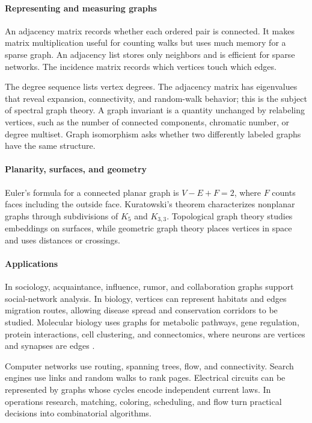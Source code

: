 \paragraph{Representing and measuring graphs}
An adjacency matrix records whether each ordered pair is connected. It makes matrix multiplication useful for counting walks but uses much memory for a sparse graph. An adjacency list stores only neighbors and is efficient for sparse networks. The incidence matrix records which vertices touch which edges.

The degree sequence lists vertex degrees. The adjacency matrix has eigenvalues that reveal expansion, connectivity, and random-walk behavior; this is the subject of spectral graph theory. A graph invariant is a quantity unchanged by relabeling vertices, such as the number of connected components, chromatic number, or degree multiset. Graph isomorphism asks whether two differently labeled graphs have the same structure.

\paragraph{Planarity, surfaces, and geometry}
Euler's formula for a connected planar graph is $V-E+F=2$, where $F$ counts faces including the outside face. Kuratowski's theorem characterizes nonplanar graphs through subdivisions of $K_5$ and $K_{3,3}$. Topological graph theory studies embeddings on surfaces, while geometric graph theory places vertices in space and uses distances or crossings.

\paragraph{Applications}
In sociology, acquaintance, influence, rumor, and collaboration graphs support social-network analysis. In biology, vertices can represent habitats and edges migration routes, allowing disease spread and conservation corridors to be studied. Molecular biology uses graphs for metabolic pathways, gene regulation, protein interactions, cell clustering, and connectomics, where neurons are vertices and synapses are edges \cite{graph_theory_ref3}.

Computer networks use routing, spanning trees, flow, and connectivity. Search engines use links and random walks to rank pages. Electrical circuits can be represented by graphs whose cycles encode independent current laws. In operations research, matching, coloring, scheduling, and flow turn practical decisions into combinatorial algorithms.

